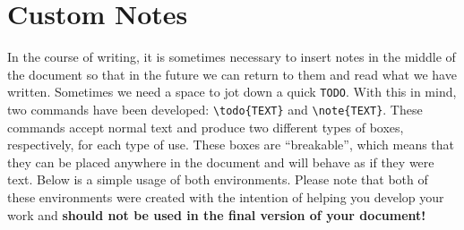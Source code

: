 \chapter{Custom Notes}
\label{cp:notes}

In the course of writing, it is sometimes necessary to insert notes in the middle of the document so that in the future we can return to them and read what we have written. Sometimes we need a space to jot down a quick \verb|TODO|. With this in mind, two commands have been developed: \verb|\todo{TEXT}| and \verb|\note{TEXT}|. These commands accept normal text and produce two different types of boxes, respectively, for each type of use. These boxes are ``breakable'', which means that they can be placed anywhere in the document and will behave as if they were text. Below is a simple usage of both environments. Please note that both of these environments were created with the intention of helping you develop your work and \textbf{should not be used in the final version of your document!}


